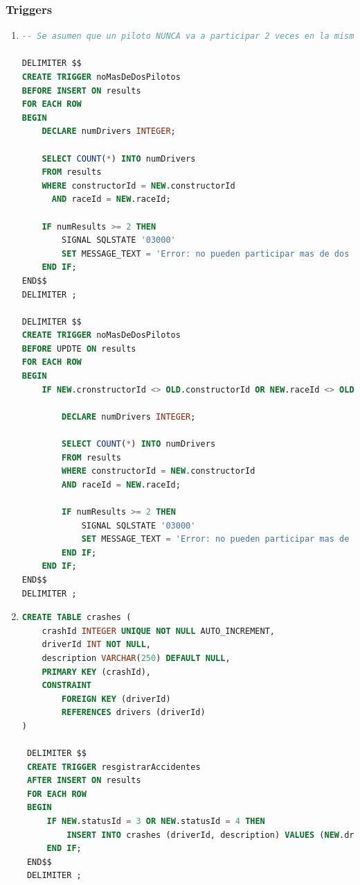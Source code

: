 \documentclass{db-practice}
\begin{document}
\subsubsection*{Triggers}
\begin{enumerate}
\item
\begin{lstlisting}[language=SQL]
-- Se asumen que un piloto NUNCA va a participar 2 veces en la misma carrera

DELIMITER $$
CREATE TRIGGER noMasDeDosPilotos
BEFORE INSERT ON results
FOR EACH ROW
BEGIN
    DECLARE numDrivers INTEGER;
    
    SELECT COUNT(*) INTO numDrivers
    FROM results
    WHERE constructorId = NEW.constructorId
      AND raceId = NEW.raceId;
        
    IF numResults >= 2 THEN
        SIGNAL SQLSTATE '03000'
        SET MESSAGE_TEXT = 'Error: no pueden participar mas de dos pilotos por equipo';
    END IF;
END$$
DELIMITER ;

DELIMITER $$
CREATE TRIGGER noMasDeDosPilotos
BEFORE UPDTE ON results
FOR EACH ROW
BEGIN
    IF NEW.cronstructorId <> OLD.constructorId OR NEW.raceId <> OLD.raceId THEN

        DECLARE numDrivers INTEGER;
        
        SELECT COUNT(*) INTO numDrivers
        FROM results
        WHERE constructorId = NEW.constructorId
        AND raceId = NEW.raceId;
            
        IF numResults >= 2 THEN
            SIGNAL SQLSTATE '03000'
            SET MESSAGE_TEXT = 'Error: no pueden participar mas de dos pilotos por equipo';
        END IF;
    END IF;
END$$
DELIMITER ;
\end{lstlisting}

\item
\begin{lstlisting}[language=SQL]
CREATE TABLE crashes (
    crashId INTEGER UNIQUE NOT NULL AUTO_INCREMENT,
    driverId INT NOT NULL,
    description VARCHAR(250) DEFAULT NULL,
    PRIMARY KEY (crashId),
    CONSTRAINT
        FOREIGN KEY (driverId)
        REFERENCES drivers (driverId)
)
 
 DELIMITER $$
 CREATE TRIGGER resgistrarAccidentes
 AFTER INSERT ON results
 FOR EACH ROW
 BEGIN
     IF NEW.statusId = 3 OR NEW.statusId = 4 THEN
         INSERT INTO crashes (driverId, description) VALUES (NEW.driverId, 'blah blah blah');
     END IF;
 END$$
 DELIMITER ;
\end{lstlisting}


\end{enumerate}
\end{document}
